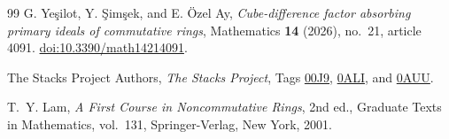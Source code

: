 \documentclass[11pt,a4paper]{amsart}
\theoremstyle{definition}
\theoremstyle{remark}
\numberwithin{equation}{section}
\begin{document}
\begin{thebibliography}{99}
G. Ye\c{s}ilot, Y. \c{S}im\c{s}ek, and E. \"Ozel Ay,
\emph{Cube-difference factor absorbing primary ideals of commutative rings},
Mathematics \textbf{14} (2026), no.~21, article 4091.
\href{https://doi.org/10.3390/math14214091}{doi:10.3390/math14214091}.

The Stacks Project Authors, \emph{The Stacks Project},
Tags \href{https://stacks.math.columbia.edu/tag/00J9}{00J9},
\href{https://stacks.math.columbia.edu/tag/0ALI}{0ALI}, and
\href{https://stacks.math.columbia.edu/tag/0AUU}{0AUU}.

T.~Y. Lam, \textit{A First Course in Noncommutative Rings}, 2nd ed.,
Graduate Texts in Mathematics, vol.~131, Springer-Verlag, New York, 2001.

\end{thebibliography}
\end{document}
